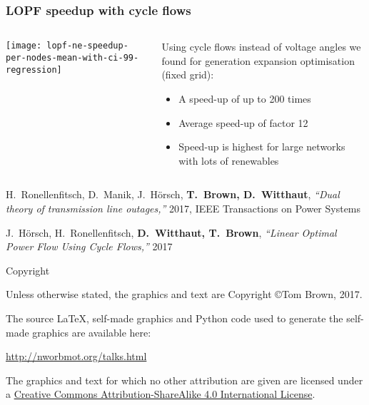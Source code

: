 \documentclass[10pt,aspectratio=169,dvipsnames]{beamer}
\let\olditem\item
\renewcommand{\item}{%
\olditem\vspace{5pt}}
\begin{document}
\begin{frame}
  \frametitle{LOPF speedup with cycle flows}
\begin{columns}[T]
  \begin{column}{7cm}
  \texttt{[image: lopf-ne-speedup-per-nodes-mean-with-ci-99-regression]}
  \end{column}
  \begin{column}{6cm}
    \vspace{0.5cm}
    Using \alert{cycle flows instead of voltage angles} we found for generation expansion optimisation (fixed grid):
    \begin{itemize}
    \item A speed-up of up to \alert{200 times}
    \item Average speed-up of \alert{factor 12}
    \item Speed-up is highest for \alert{large networks with lots of renewables}
    \end{itemize}
  \end{column}

\end{columns}

\vspace{.3cm}

  \footnotesize
H.~Ronellenfitsch, D.~Manik, J.~Hörsch, {\bf T.~Brown, D.~Witthaut}, \emph{``Dual theory of transmission line outages,''} 2017, IEEE Transactions on Power Systems

J.~Hörsch, H.~Ronellenfitsch, {\bf D.~Witthaut, T.~Brown}, \emph{``Linear Optimal Power Flow Using Cycle Flows,''} 2017

\end{frame}



\begin{frame}{Copyright}


  Unless otherwise stated, the graphics and text are Copyright \copyright Tom Brown, 2017.

  The source \LaTeX, self-made graphics and Python code used to
  generate the self-made graphics are available here:

  \url{http://nworbmot.org/talks.html}

  The graphics and text for which no other attribution are given are licensed under a
  \href{http://creativecommons.org/licenses/by-sa/4.0/}{Creative Commons
  Attribution-ShareAlike 4.0 International License}.

  \begin{center}\ccbysa\end{center}

\end{frame}
\end{document}
